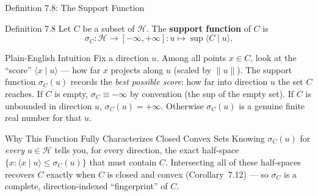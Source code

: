 \documentclass[aspectratio=169,10pt]{beamer}
\newcommand{\Hil}{\mathcal{H}}
\newcommand{\ip}[2]{\langle #1 \mid #2 \rangle}
\begin{document}
\begin{frame}{Definition 7.8: The Support Function}

  \begin{block}{Definition 7.8}
    Let $C$ be a subset of $\Hil$. The \textbf{support function} of $C$ is
    \[
      \sigma_C : \Hil \to [-\infty,+\infty] : u \mapsto \sup \ip{C}{u}.
      \tag{7.4}
    \]
  \end{block}

  \begin{block}{Plain-English Intuition}
    Fix a direction $u$. Among all points $x \in C$, look at the ``score''
    $\ip{x}{u}$ --- how far $x$ projects along $u$ (scaled by $\|u\|$). The
    support function $\sigma_C(u)$ records the \emph{best possible score}:
    how far into direction $u$ the set $C$ reaches. If $C$ is empty,
    $\sigma_C \equiv -\infty$ by convention (the sup of the empty set). If
    $C$ is unbounded in direction $u$, $\sigma_C(u) = +\infty$. Otherwise
    $\sigma_C(u)$ is a genuine finite real number for that $u$.
  \end{block}

  \begin{alertblock}{Why This Function Fully Characterizes Closed Convex Sets}
    Knowing $\sigma_C(u)$ for \emph{every} $u \in \Hil$ tells you, for every
    direction, the exact half-space $\{x : \ip{x}{u} \le \sigma_C(u)\}$ that
    must contain $C$. Intersecting all of these half-spaces recovers $C$
    exactly when $C$ is closed and convex (Corollary~7.12) --- so $\sigma_C$
    is a complete, direction-indexed ``fingerprint'' of $C$.
  \end{alertblock}

\end{frame}
\end{document}
